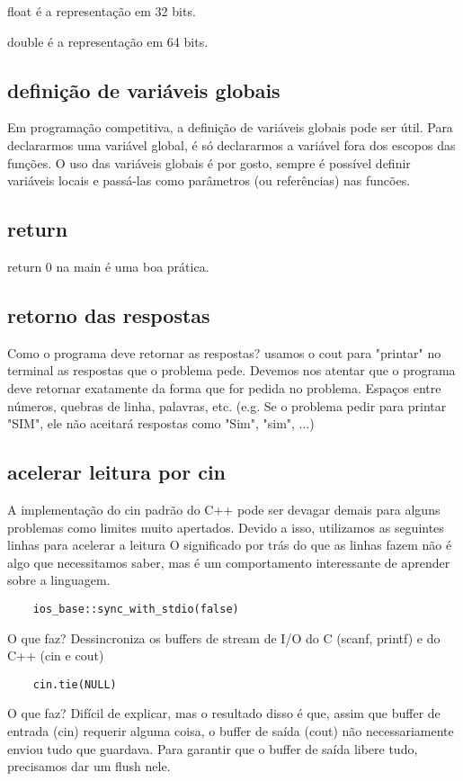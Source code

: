 \documentclass{article}
\begin{document}
float é a representação em 32 bits.

double é a representação em 64 bits.

\subsection{definição de variáveis globais}
Em programação competitiva, a definição de variáveis globais pode ser útil.
Para declararmos uma variável global, é só declararmos a variável fora dos escopos das funções.
O uso das variáveis globais é por gosto, sempre é possível definir variáveis locais e 
passá-las como parâmetros (ou referências) nas funcões.

\subsection{return}
return 0 na main é uma boa prática.

\subsection{retorno das respostas}
Como o programa deve retornar as respostas? usamos o cout para "printar" no terminal as respostas que o problema pede.
Devemos nos atentar que o programa deve retornar exatamente da forma que for pedida no problema.
Espaços entre números, quebras de linha, palavras, etc.
(e.g. Se o problema pedir para printar "SIM", ele não aceitará respostas como "Sim", "sim", ...)

\subsection{acelerar leitura por cin}
A implementação do cin padrão do C++ pode ser devagar demais para alguns problemas como
limites muito apertados. Devido a isso, utilizamos as seguintes linhas para acelerar a leitura
O significado por trás do que as linhas fazem não é algo que necessitamos saber, mas 
é um comportamento interessante de aprender sobre a linguagem.

\begin{verbatim}
    ios_base::sync_with_stdio(false)
\end{verbatim}
O que faz? Dessincroniza os buffers de stream de I/O do C (scanf, printf) e do C++ (cin e cout)

\begin{verbatim}
    cin.tie(NULL)
\end{verbatim}
O que faz? Difícil de explicar, mas o resultado disso é que, assim que buffer de entrada (cin)
requerir alguma coisa, o buffer de saída (cout) não necessariamente enviou tudo que guardava.
Para garantir que o buffer de saída libere tudo, precisamos dar um flush nele.
\end{document}
